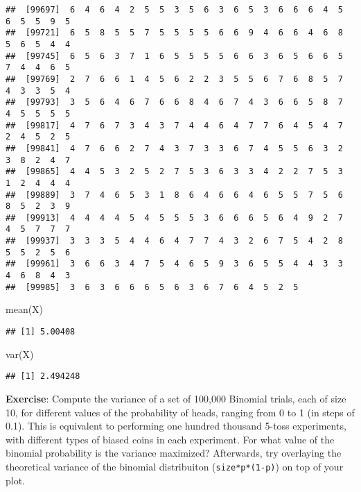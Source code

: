\documentclass[
]{book}
\newenvironment{Shaded}{\begin{snugshade}}{\end{snugshade}}
\newcommand{\FunctionTok}[1]{\textcolor[rgb]{0.00,0.00,0.00}{#1}}
\newcommand{\NormalTok}[1]{#1}
\begin{document}
\begin{verbatim}
##  [99697]  6  4  6  4  2  5  5  3  5  6  3  6  5  3  6  6  6  4  5  6  5  5  9  5
##  [99721]  6  5  8  5  5  7  5  5  5  5  6  6  9  4  6  6  4  6  8  5  6  5  4  4
##  [99745]  6  5  6  3  7  1  6  5  5  5  5  6  6  3  6  5  6  6  5  7  4  4  6  5
##  [99769]  2  7  6  6  1  4  5  6  2  2  3  5  5  6  7  6  8  5  7  4  3  3  5  4
##  [99793]  3  5  6  4  6  7  6  6  8  4  6  7  4  3  6  6  5  8  7  4  5  5  5  5
##  [99817]  4  7  6  7  3  4  3  7  4  4  6  4  7  7  6  4  5  4  7  2  4  5  2  5
##  [99841]  4  7  6  6  2  7  4  3  7  3  3  6  7  4  5  5  6  3  2  3  8  2  4  7
##  [99865]  4  4  5  3  2  5  2  7  5  3  6  3  3  4  2  2  7  5  3  1  2  4  4  4
##  [99889]  3  7  4  6  5  3  1  8  6  4  6  6  4  6  5  5  7  5  6  8  5  2  3  9
##  [99913]  4  4  4  4  5  4  5  5  5  3  6  6  6  5  6  4  9  2  7  4  5  7  7  7
##  [99937]  3  3  3  5  4  4  6  4  7  7  4  3  2  6  7  5  4  2  8  5  5  2  5  6
##  [99961]  3  6  6  3  4  7  5  4  6  5  9  3  6  5  5  4  4  3  3  4  6  8  4  3
##  [99985]  3  6  3  6  6  6  5  6  3  6  7  6  4  5  2  5
\end{verbatim}

\begin{Shaded}
\begin{Highlighting}[]
\FunctionTok{mean}\NormalTok{(X)}
\end{Highlighting}
\end{Shaded}

\begin{verbatim}
## [1] 5.00408
\end{verbatim}

\begin{Shaded}
\begin{Highlighting}[]
\FunctionTok{var}\NormalTok{(X)}
\end{Highlighting}
\end{Shaded}

\begin{verbatim}
## [1] 2.494248
\end{verbatim}

\textbf{Exercise}: Compute the variance of a set of 100,000 Binomial trials, each of size 10, for different values of the probability of heads, ranging from 0 to 1 (in steps of 0.1). This is equivalent to performing one hundred thousand 5-toss experiments, with different types of biased coins in each experiment. For what value of the binomial probability is the variance maximized? Afterwards, try overlaying the theoretical variance of the binomial distribuiton (\texttt{size*p*(1-p)}) on top of your plot.
\end{document}
